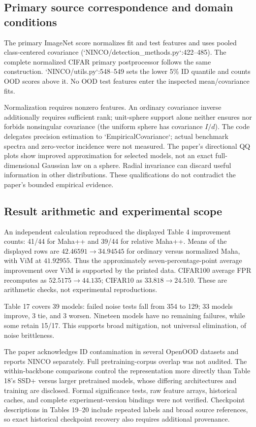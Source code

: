 \documentclass[10pt]{article}
\begin{document}
\subsection*{Primary source correspondence and domain conditions}
The primary ImageNet score normalizes fit and test features and uses pooled class-centered covariance (`NINCO/detection\_methods.py`:422–485). The complete normalized CIFAR primary postprocessor follows the same construction. `NINCO/utils.py`:548–549 sets the lower 5\% ID quantile and counts OOD scores above it. No OOD test features enter the inspected mean/covariance fits.\par
Normalization requires nonzero features. An ordinary covariance inverse additionally requires sufficient rank; unit-sphere support alone neither ensures nor forbids nonsingular covariance (the uniform sphere has covariance \(I/d\)). The code delegates precision estimation to `EmpiricalCovariance`; actual benchmark spectra and zero-vector incidence were not measured. The paper’s directional QQ plots show improved approximation for selected models, not an exact full-dimensional Gaussian law on a sphere. Radial invariance can discard useful information in other distributions. These qualifications do not contradict the paper’s bounded empirical evidence.\par
\subsection*{Result arithmetic and experimental scope}
An independent calculation reproduced the displayed Table 4 improvement counts: 41/44 for Maha++ and 39/44 for relative Maha++. Means of the displayed rows are \(42.46591\to34.94545\) for ordinary versus normalized Maha, with ViM at \(41.92955\). Thus the approximately seven-percentage-point average improvement over ViM is supported by the printed data. CIFAR100 average FPR recomputes as \(52.5175\to44.135\); CIFAR10 as \(33.818\to24.510\). These are arithmetic checks, not experimental reproductions.\par
Table 17 covers 39 models: failed noise tests fall from 354 to 129; 33 models improve, 3 tie, and 3 worsen. Nineteen models have no remaining failures, while some retain 15/17. This supports broad mitigation, not universal elimination, of noise brittleness.\par
The paper acknowledges ID contamination in several OpenOOD datasets and reports NINCO separately. Full pretraining-corpus overlap was not audited. The within-backbone comparisons control the representation more directly than Table 18’s SSD+ versus larger pretrained models, whose differing architectures and training are disclosed. Formal significance tests, raw feature arrays, historical caches, and complete experiment-version bindings were not verified. Checkpoint descriptions in Tables 19–20 include repeated labels and broad source references, so exact historical checkpoint recovery also requires additional provenance.\par
\end{document}
